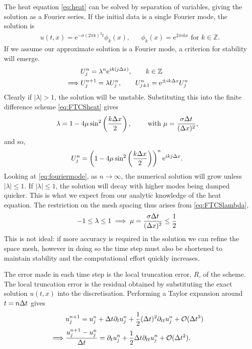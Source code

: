 The heat equation \eqref{eq:heat} can be solved by separation of variables, giving the solution as a Fourier series. If the initial data is a single Fourier mode, the solution is
\begin{align*}
&u(t,x) = \mathrm{e}^{-\sigma(2\pi k)^2 t} \phi_k(x), && \phi_k(x) = \mathrm{e}^{2\pi i k x} \text{ for } k \in \mathbb{Z}.
\end{align*} 
If we assume our approximate solution is a Fourier mode, a criterion for stability will emerge.
\begin{align}
&U^n_j = \lambda^n \mathrm{e}^{ik(j\Delta x)}, \qquad k \in \mathbb{Z} \label{eq:fouriermode}\\
\implies &U^{n+1}_j = \lambda U^n_j, \qquad U^n_{j\pm 1} = \mathrm{e}^{\pm ik\Delta x}U^n_j \notag \\
\end{align}
Clearly if $|\lambda|>1$, the solution will be unstable. Substituting this into the finite difference scheme \eqref{eq:FTCSheat} gives
\begin{equation}\label{eq:FTCSlambda}
\lambda = 1 - 4\mu \sin^2\left(\frac{k\Delta x}{2}\right), \qquad \text{ with } \mu = \frac{\sigma \Delta t}{(\Delta x)^2},
\end{equation}
and so,
\[
U^n_j = \left(1 - 4\mu \sin^2\left(\frac{k\Delta x}{2}\right)\right)^n\mathrm{e}^{ikj\Delta x}.
\]
Looking at \eqref{eq:fouriermode}, as $n \to \infty$, the numerical solution will grow unless $|\lambda|\leq 1$. If  $|\lambda|\leq 1$, the solution will decay with higher modes being damped quicker. This is what we expect from our analytic knowledge of the heat equation. The restriction on the mesh spacing thus arises from \eqref{eq:FTCSlambda}, 
\begin{align*}
-1 \leq \lambda \leq 1 \implies  \mu = \frac{\sigma \Delta t}{(\Delta x) ^2} \leq \frac{1}{2}
\end{align*}
This is not ideal: if more accuracy is required in the solution we can refine the space mesh, however in doing so the time step must also be shortened to maintain stability and the computational effort quickly increases.


The error made in each time step is the local truncation error, $R$, of the scheme. The local truncation error is the residual obtained by substituting the exact solution $u(t,x)$ into the discretisation. Performing a Taylor expansion around $t = n\Delta t$ gives
\begin{align*}
&u^{n+1}_j = u^n_j + \Delta t \partial_t u^n_j + \frac{1}{2}(\Delta t)^2 \partial_{tt} u^n_j + \mathcal{O}(\Delta t^3)\\
\implies& \frac{u^{n+1}_j - u^n_j}{\Delta t}= \partial_t u^n_j + \frac{1}{2}\Delta t \partial_{tt} u^n_j + \mathcal{O}(\Delta t^2).
\end{align*}

